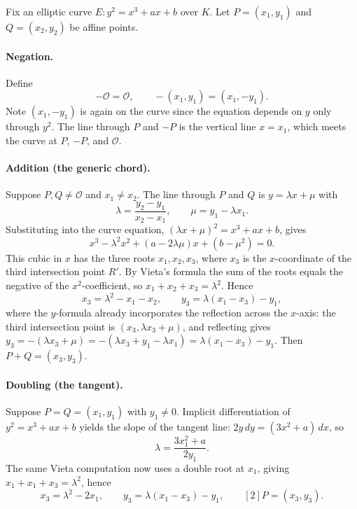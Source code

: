 \documentclass[11pt,a4paper]{article}
\theoremstyle{definition}
\theoremstyle{remark}
\begin{document}
Fix an elliptic curve \(E : y^2 = x^3 + ax + b\) over \(K\). Let \(P = (x_1, y_1)\) and \(Q = (x_2, y_2)\) be affine points.

\paragraph{Negation.} Define
\[
  -\mathcal{O} = \mathcal{O}, \qquad -(x_1, y_1) = (x_1, -y_1).
\]
Note \((x_1, -y_1)\) is again on the curve since the equation depends on \(y\) only through \(y^2\). The line through \(P\) and \(-P\) is the vertical line \(x = x_1\), which meets the curve at \(P\), \(-P\), and \(\mathcal{O}\).

\paragraph{Addition (the generic chord).} Suppose \(P, Q \neq \mathcal{O}\) and \(x_1 \neq x_2\). The line through \(P\) and \(Q\) is \(y = \lambda x + \mu\) with
\[
  \lambda = \frac{y_2 - y_1}{x_2 - x_1}, \qquad \mu = y_1 - \lambda x_1 .
\]
Substituting into the curve equation, \((\lambda x + \mu)^2 = x^3 + a x + b\), gives
\[
  x^3 - \lambda^2 x^2 + (a - 2\lambda\mu) x + (b - \mu^2) = 0 .
\]
This cubic in \(x\) has the three roots \(x_1, x_2, x_3\), where \(x_3\) is the \(x\)-coordinate of the third intersection point \(R'\). By Vieta's formula the sum of the roots equals the negative of the \(x^2\)-coefficient, so \(x_1 + x_2 + x_3 = \lambda^2\). Hence
\begin{equation}\label{ellipticcurves:eq-add}
  x_3 = \lambda^2 - x_1 - x_2, \qquad y_3 = \lambda (x_1 - x_3) - y_1,
\end{equation}
where the \(y\)-formula already incorporates the reflection across the \(x\)-axis: the third intersection point is \((x_3, \lambda x_3 + \mu)\), and reflecting gives \(y_3 = -(\lambda x_3 + \mu) = -(\lambda x_3 + y_1 - \lambda x_1) = \lambda(x_1 - x_3) - y_1\). Then \(P + Q = (x_3, y_3)\).

\paragraph{Doubling (the tangent).} Suppose \(P = Q = (x_1, y_1)\) with \(y_1 \neq 0\). Implicit differentiation of \(y^2 = x^3 + ax + b\) yields the slope of the tangent line: \(2 y \, dy = (3x^2 + a)\, dx\), so
\[
  \lambda = \frac{3 x_1^2 + a}{2 y_1} .
\]
The same Vieta computation now uses a double root at \(x_1\), giving \(x_1 + x_1 + x_3 = \lambda^2\), hence
\begin{equation}\label{ellipticcurves:eq-double}
  x_3 = \lambda^2 - 2 x_1, \qquad y_3 = \lambda(x_1 - x_3) - y_1, \qquad [2]P = (x_3, y_3).
\end{equation}
\end{document}
